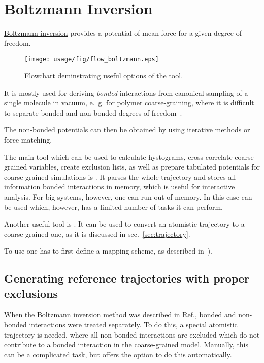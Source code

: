 \chapter{Boltzmann Inversion}

\hyperref[sec:bi]{Boltzmann inversion} provides a potential of mean force for a given degree of freedom. 
%
\begin{wrapfigure}{t}{7cm}
   \centering
   \texttt{[image: usage/fig/flow\_boltzmann.eps]}
   \caption{Flowchart deminstrating useful options of the tool.}
\end{wrapfigure}
%
It is mostly used for deriving {\em bonded} interactions from canonical sampling of a single molecule in vacuum, e.~g. for polymer coarse-graining, where it is difficult to separate bonded and non-bonded degrees of freedom~\cite{Tschoep:1998}.

The non-bonded potentials can then be obtained by using iterative  methods or force matching.

The main tool which can be used to calculate hystograms, cross-correlate coarse-grained variables, create exclusion lists, as well as prepare tabulated potentials for coarse-grained simulations is .  It parses the whole trajectory and stores all information bonded interactions in memory, which is useful for interactive analysis. For big systems, however, one can run out of memory. In this case  can be used which, however, has a limited number of tasks it can perform.

Another useful tool is . It can be used to convert an atomistic trajectory to a coarse-grained one, as it is discussed in sec.~\ref{sec:trajectory}.

To use  one has to first define a mapping scheme, as described in~). 

\section{Generating reference trajectories with proper exclusions}
When the Boltzmann inversion method was described in Ref.\cite{Tschoep:1998}, bonded and non-bonded interactions were treated separately. To do this, a special atomistic trajectory is needed, where all non-bonded interactions are excluded which do not contribute to a bonded interaction in the coarse-grained model. Manually, this can be a complicated task, but  offers the option  to do this automatically.

